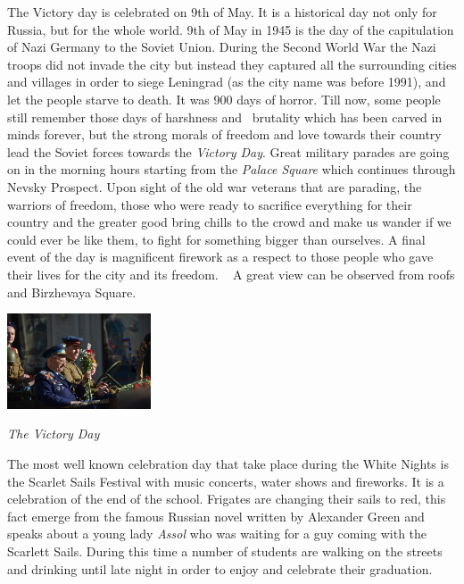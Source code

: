 \documentclass[10pt,a4paper]{article} %
\begin{document}
\begin{multicols}{3}
The Victory day is celebrated on 9th of May. 
It is a historical day not only for Russia, but for the whole world. 
9th of May in 1945 is the day of the capitulation of Nazi Germany to the Soviet Union. 
During the Second World War the Nazi troops did not invade the city 
but instead they captured all the surrounding cities and villages in order to 
siege Leningrad (as the city name was before 1991), and let the people starve to death. 
It was 900 days of horror. 
Till now, some people still remember those days of harshness and  
brutality which has been carved in minds forever, 
but the strong morals of freedom and love towards their country lead 
the Soviet forces towards the \textit{Victory Day}. 
Great military parades are going on in the morning hours starting from 
the \textit{Palace Square} which continues through Nevsky Prospect. 
Upon sight of the old war veterans that are parading, the warriors of freedom, 
those who were ready to sacrifice everything for their country and the greater 
good bring chills to the crowd and make us wander if we could ever be like them, 
to fight for something bigger than ourselves. 
A final event of the day is magnificent firework as a respect to those people 
who gave their lives for the city and its freedom.  
A great view can be observed from roofs and Birzhevaya Square.

\begin{center}
	\includegraphics[width=0.32\textwidth]{media/victory_day.jpg}
	\par\textit{The Victory Day}
\end{center}

The most well known celebration day that take place during the White Nights is 
the Scarlet Sails Festival with music concerts, water shows and fireworks. 
It is a celebration of the end of the school. 
Frigates are changing their sails to red, this fact emerge from the 
famous Russian novel written by Alexander Green and speaks about a young lady 
\textit{Assol} who was waiting for a guy coming with the Scarlett Sails. 
During this time a number of students are walking on the streets and 
drinking until late night in order to enjoy and celebrate their graduation.


\end{multicols}
\end{document}
